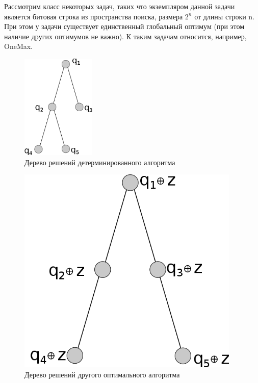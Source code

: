 Рассмотрим класс некоторых задач, таких что экземпляром данной задачи является битовая строка из пространства поиска, размера $2^n$ от длины строки n. При этом у задачи существует единственный глобальный оптимум (при этом  наличие других оптимумов не важно). К таким задачам относится, например, OneMax.

\begin{figure}[H]
\caption{Дерево решений детерминированного алгоритма}\label{fig2}
    \includegraphics[height=5cm]{ITMO/pic/graph1.png}
\end{figure}


\begin{figure}[H]
\caption{Дерево решений другого оптимального алгоритма}\label{fig2}
    \includegraphics[height=10cm]{ITMO/pic/graph2.png}
\end{figure}


